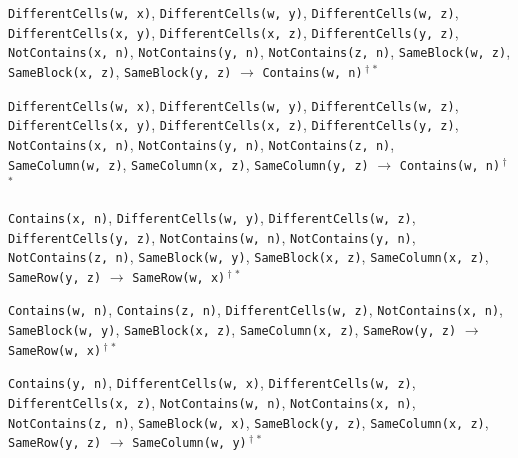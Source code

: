 \documentclass[11pt,a4paper]{article}
\theoremstyle{definition}
\theoremstyle{remark}
\begin{document}
{\begin{enumerate}[label={[\arabic*]},leftmargin=2.6em,itemsep=1pt]
  \item \texttt{DifferentCells(w,~x)}, \allowbreak \texttt{DifferentCells(w,~y)}, \allowbreak \texttt{DifferentCells(w,~z)}, \allowbreak \texttt{DifferentCells(x,~y)}, \allowbreak \texttt{DifferentCells(x,~z)}, \allowbreak \texttt{DifferentCells(y,~z)}, \allowbreak \texttt{NotContains(x,~n)}, \allowbreak \texttt{NotContains(y,~n)}, \allowbreak \texttt{NotContains(z,~n)}, \allowbreak \texttt{SameBlock(w,~z)}, \allowbreak \texttt{SameBlock(x,~z)}, \allowbreak \texttt{SameBlock(y,~z)} \;$\to$\; \texttt{Contains(w,~n)}\,$^{\dagger}$\,$^{\ast}$
  \item \texttt{DifferentCells(w,~x)}, \allowbreak \texttt{DifferentCells(w,~y)}, \allowbreak \texttt{DifferentCells(w,~z)}, \allowbreak \texttt{DifferentCells(x,~y)}, \allowbreak \texttt{DifferentCells(x,~z)}, \allowbreak \texttt{DifferentCells(y,~z)}, \allowbreak \texttt{NotContains(x,~n)}, \allowbreak \texttt{NotContains(y,~n)}, \allowbreak \texttt{NotContains(z,~n)}, \allowbreak \texttt{SameColumn(w,~z)}, \allowbreak \texttt{SameColumn(x,~z)}, \allowbreak \texttt{SameColumn(y,~z)} \;$\to$\; \texttt{Contains(w,~n)}\,$^{\dagger}$\,$^{\ast}$
  \item \texttt{Contains(x,~n)}, \allowbreak \texttt{DifferentCells(w,~y)}, \allowbreak \texttt{DifferentCells(w,~z)}, \allowbreak \texttt{DifferentCells(y,~z)}, \allowbreak \texttt{NotContains(w,~n)}, \allowbreak \texttt{NotContains(y,~n)}, \allowbreak \texttt{NotContains(z,~n)}, \allowbreak \texttt{SameBlock(w,~y)}, \allowbreak \texttt{SameBlock(x,~z)}, \allowbreak \texttt{SameColumn(x,~z)}, \allowbreak \texttt{SameRow(y,~z)} \;$\to$\; \texttt{SameRow(w,~x)}\,$^{\dagger}$\,$^{\ast}$
  \item \texttt{Contains(w,~n)}, \allowbreak \texttt{Contains(z,~n)}, \allowbreak \texttt{DifferentCells(w,~z)}, \allowbreak \texttt{NotContains(x,~n)}, \allowbreak \texttt{SameBlock(w,~y)}, \allowbreak \texttt{SameBlock(x,~z)}, \allowbreak \texttt{SameColumn(x,~z)}, \allowbreak \texttt{SameRow(y,~z)} \;$\to$\; \texttt{SameRow(w,~x)}\,$^{\dagger}$\,$^{\ast}$
  \item \texttt{Contains(y,~n)}, \allowbreak \texttt{DifferentCells(w,~x)}, \allowbreak \texttt{DifferentCells(w,~z)}, \allowbreak \texttt{DifferentCells(x,~z)}, \allowbreak \texttt{NotContains(w,~n)}, \allowbreak \texttt{NotContains(x,~n)}, \allowbreak \texttt{NotContains(z,~n)}, \allowbreak \texttt{SameBlock(w,~x)}, \allowbreak \texttt{SameBlock(y,~z)}, \allowbreak \texttt{SameColumn(x,~z)}, \allowbreak \texttt{SameRow(y,~z)} \;$\to$\; \texttt{SameColumn(w,~y)}\,$^{\dagger}$\,$^{\ast}$

\end{enumerate}}
\end{document}
